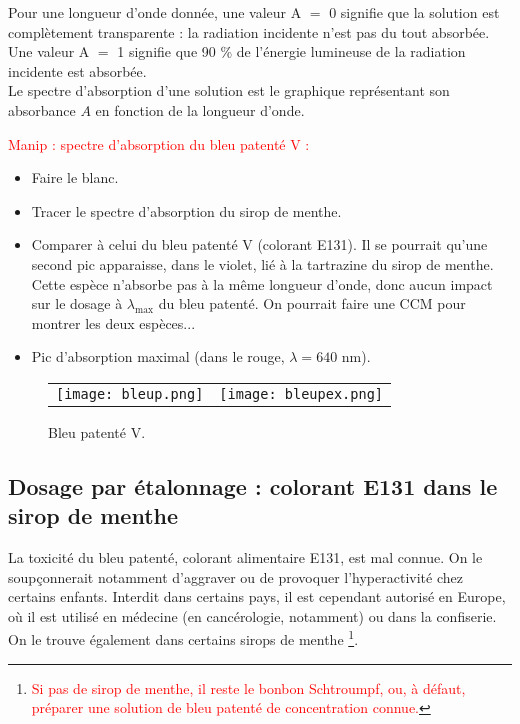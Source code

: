 \documentclass[11pt,a4paper]{report}
\begin{document}
Pour une longueur d'onde donnée, une valeur A $=$ 0 signifie que la solution est complètement
transparente : la radiation incidente n'est pas du tout absorbée. Une valeur A $=$ 1 signifie que 90
\% de l'énergie lumineuse de la radiation incidente est absorbée.\\

Le spectre d'absorption d'une solution est le graphique représentant son absorbance $A$ en fonction
de la longueur d'onde.

\textcolor{red}{Manip : spectre d'absorption du bleu patenté V :}
\begin{itemize}
	\item Faire le blanc.
	\item Tracer le spectre d'absorption du sirop de menthe.
	\item Comparer à celui du bleu patenté V (colorant E131). Il se pourrait qu'une second pic 					apparaisse, dans le violet, lié à la tartrazine du sirop de menthe. Cette espèce n'absorbe pas 			à la même longueur d'onde, donc aucun impact sur le dosage à $\lambda_\text{max}$ du bleu 				patenté. On pourrait faire une CCM pour montrer les deux espèces...
	\item Pic d'absorption maximal (dans le rouge, $\lambda = 640$ nm).
\end{itemize}

\begin{figure}[h!]
	\begin{center}
	\begin{tabular}{cc}
	  	\texttt{[image: bleup.png]} &
   		\texttt{[image: bleupex.png]}\\
	\end{tabular}
	\caption{Bleu patenté V.}
	\end{center}
\end{figure}

\subsection{Dosage par étalonnage : colorant E131 dans le sirop de menthe}

La toxicité du bleu patenté, colorant alimentaire E131, est mal connue. On le soupçonnerait notamment d'aggraver ou de provoquer l'hyperactivité chez certains enfants. Interdit dans certains pays, il est cependant autorisé en Europe, où il est utilisé en médecine (en cancérologie, notamment) ou dans la confiserie. On le trouve également dans certains sirops de menthe \footnote{\textcolor{red}{Si pas de sirop de menthe, il reste le bonbon Schtroumpf, ou, à défaut, préparer une solution de bleu patenté de concentration connue.}}.\\  
\end{document}
